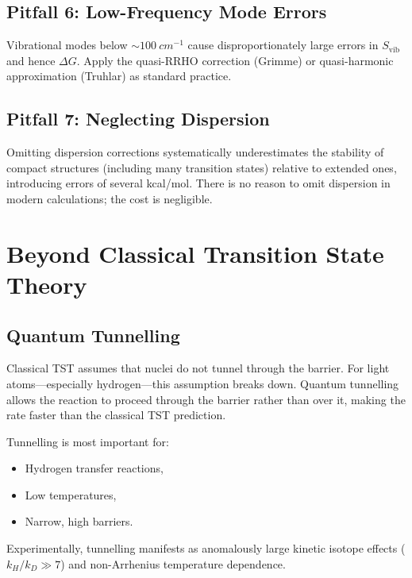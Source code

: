 \documentclass[11pt]{article}
\numberwithin{equation}{section}
\begin{document}
\subsection{Pitfall 6: Low-Frequency Mode Errors}

Vibrational modes below $\sim\!\SI{100}{cm^{-1}}$ cause disproportionately large errors in $S_\text{vib}$ and hence $\Delta G$. Apply the quasi-RRHO correction (Grimme) or quasi-harmonic approximation (Truhlar) as standard practice.

\subsection{Pitfall 7: Neglecting Dispersion}

Omitting dispersion corrections systematically underestimates the stability of compact structures (including many transition states) relative to extended ones, introducing errors of several kcal/mol. There is no reason to omit dispersion in modern calculations; the cost is negligible.


\section{Beyond Classical Transition State Theory}
\label{sec:beyond_TST}

\subsection{Quantum Tunnelling}

Classical TST assumes that nuclei do not tunnel through the barrier. For light atoms---especially hydrogen---this assumption breaks down. Quantum tunnelling allows the reaction to proceed through the barrier rather than over it, making the rate faster than the classical TST prediction.

Tunnelling is most important for:
\begin{itemize}
\item Hydrogen transfer reactions,
\item Low temperatures,
\item Narrow, high barriers.
\end{itemize}

Experimentally, tunnelling manifests as anomalously large kinetic isotope effects ($k_H/k_D \gg 7$) and non-Arrhenius temperature dependence.
\end{document}
